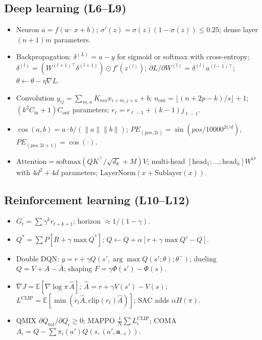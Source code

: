 \documentclass[11pt]{article}
\begin{document}
\subsection{Deep learning (L6--L9)}
\begin{itemize}
\item Neuron $a=f(w\cdot x+b)$; $\sigma'(z)=\sigma(z)(1-\sigma(z))\le0.25$; dense layer $(n+1)m$ parameters.
\item Backpropagation: $\delta^{(L)}=a-y$ for sigmoid or softmax with cross-entropy;\\ $\delta^{(l)}=(W^{(l+1)\top}\delta^{(l+1)})\odot f'(z^{(l)})$; $\partial L/\partial W^{(l)}=\delta^{(l)}a^{(l-1)\top}$; $\theta\leftarrow\theta-\eta\nabla L$.
\item Convolution $y_{ij}=\sum_{m,n}K_{mn}x_{i+m,j+n}+b$; $n_{\text{out}}=\lfloor(n+2p-k)/s\rfloor+1$; $(k^2C_{\text{in}}+1)C_{\text{out}}$ parameters; $r_\ell=r_{\ell-1}+(k-1)j_{\ell-1}$.
\item $\cos(a,b)=a\cdot b/(\lVert a\rVert\lVert b\rVert)$; $PE_{(pos,2i)}=\sin(pos/10000^{2i/d})$, $PE_{(pos,2i+1)}=\cos(\cdot)$.
\item $\text{Attention}=\text{softmax}(QK^{\top}/\sqrt{d_k}+M)V$; multi-head $[\text{head}_1;\dots;\text{head}_h]W^O$ with $4d^2+4d$ parameters; $\text{LayerNorm}(x+\text{Sublayer}(x))$.
\end{itemize}
\subsection{Reinforcement learning (L10--L12)}
\begin{itemize}
\item $G_t=\sum\gamma^kr_{t+k+1}$; horizon $\approx1/(1-\gamma)$.
\item $Q^*=\sum P[R+\gamma\max Q^*]$; $Q\leftarrow Q+\alpha[r+\gamma\max Q'-Q]$.
\item Double DQN: $y=r+\gamma Q(s',\arg\max Q(s';\theta);\theta^-)$; dueling $Q=V+A-\bar A$; shaping $F=\gamma\Phi(s')-\Phi(s)$.
\item $\nabla J=\mathbb E[\nabla\log\pi\,\hat A]$; $\hat A=r+\gamma V(s')-V(s)$; $L^{\text{CLIP}}=\mathbb E[\min(r_t\hat A,\text{clip}(r_t)\hat A)]$; SAC adds $\alpha H(\pi)$.
\item QMIX $\partial Q_{\text{tot}}/\partial Q_i\ge0$; MAPPO $\frac1N\sum L_i^{\text{CLIP}}$; COMA $A_i=Q-\sum\pi_i(a')Q(s,(a',\mathbf a_{-i}))$.
\end{itemize}
\end{document}
